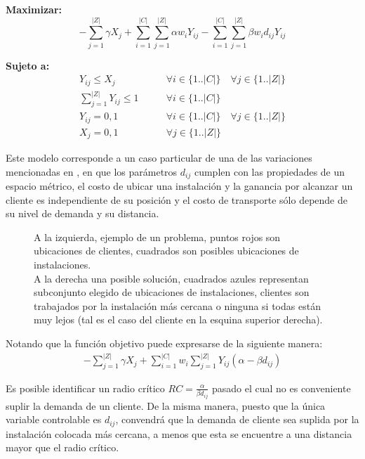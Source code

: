\textbf{Maximizar:}
\begin{equation}
    - \sum_{j=1}^{|Z|} \gamma X_{j} + \sum_{i=1}^{|C|} \sum_{j=1}^{|Z|} \alpha w_i Y_{ij} - \sum_{i=1}^{|C|} \sum_{j=1}^{|Z|} \beta w_i d_{ij} Y_{ij}
\end{equation}

\textbf{Sujeto a:}
\begin{align*}
    Y_{ij} \leq X_{j} &\qquad \forall i \in \{1..|C|\} \quad \forall j \in \{1..|Z|\} \\
    \sum_{j=1}^{|Z|} Y_{ij} \leq 1 &\qquad \forall i \in \{1..|C|\} \\
    Y_{ij} = 0,1 &\qquad \forall i \in \{1..|C|\} \quad \forall j \in \{1..|Z|\} \\
    X_{j} = 0,1 &\qquad \forall j \in \{1..|Z|\}
\end{align*}

Este modelo corresponde a un caso particular de una de las variaciones mencionadas en \cite{mukundan1991joint}, en que los parámetros $d_{ij}$ cumplen con las propiedades de un espacio métrico, el costo de ubicar una instalación y la ganancia por alcanzar un cliente es independiente de su posición y el costo de transporte sólo depende de su nivel de demanda y su distancia.

\begin{figure}%
    \centering
    \qquad \qquad \qquad
    \caption{A la izquierda, ejemplo de un problema, puntos rojos son ubicaciones de clientes, cuadrados son posibles ubicaciones de instalaciones.\\ A la derecha una posible solución, cuadrados azules representan subconjunto elegido de ubicaciones de instalaciones, clientes son trabajados por la instalación más cercana o ninguna si todas están muy lejos (tal es el caso del cliente en la esquina superior derecha).}
    \label{fig:problem}
\end{figure}

Notando que la función objetivo puede expresarse de la siguiente manera:
\begin{align*}
    -\sum_{j=1}^{|Z|} \gamma X_{j} + \sum_{i=1}^{|C|} w_i \sum_{j=1}^{|Z|} Y_{ij} (\alpha - \beta d_{ij})
\end{align*}

Es posible identificar un radio crítico $RC = \frac{\alpha}{\beta d_{ij}}$ pasado el cual no es conveniente suplir la demanda de un cliente. De la misma manera, puesto que la única variable controlable es $d_{ij}$, convendrá que la demanda de cliente sea suplida por la instalación colocada más cercana, a menos que esta se encuentre a una distancia mayor que el radio crítico.

